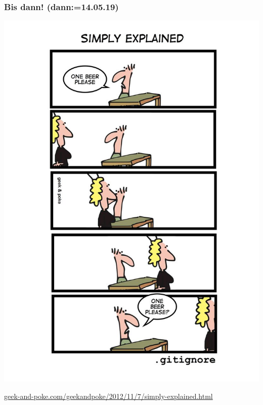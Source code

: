\documentclass[18pt]{beamer}
\begin{document}
	\begin{frame}
		\frametitle{Bis dann! (dann:=14.05.19)}
		\centering
		\includegraphics[height=0.85\textheight]{./comics/geek_and_poke_gitignore.jpg}
		\begin{turn}{90}
			\tiny\url{geek-and-poke.com/geekandpoke/2012/11/7/simply-explained.html}
		\end{turn}
	\end{frame}
\end{document}
